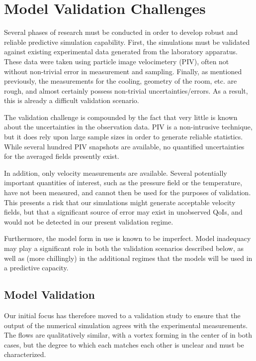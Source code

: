 \documentclass{article}
\begin{document}
%
%
\section{Model Validation Challenges}


Several phases of research must be conducted in order to develop robust
and reliable predictive simulation capability. First, the simulations
must be validated against existing experimental data generated from the
laboratory apparatus. These data were taken using particle image
velocimetery (PIV), often not without non-trivial error in measurement and
sampling. Finally, as mentioned previously, the measurements for the
cooling, geometry of the room, etc. are rough, and almost certainly
possess non-trivial uncertainties/errors. As a result, this is already a
difficult validation scenario. 

The validation challenge is compounded by the fact that very little is
known about the uncertainties in the observation data. PIV is a
non-intrusive technique, but it does rely upon large sample sizes in
order to generate reliable statistics. While several hundred PIV
snapshots are available, no quantified uncertainties for the averaged fields
presently exist.  

In addition, only velocity measurements are available. Several
potentially important quantities of interest, such as the pressure field
or the temperature, have not been measured, and cannot then be used for
the purposes of validation. This presents a risk that our 
simulations might generate acceptable velocity fields, but that a
significant source of error may exist in unobserved QoIs, and would not
be detected in our present validation regime. 

Furthermore, the model form in use is known to be imperfect. 
Model inadequacy may play a significant role in both the validation
scenarios described below, as well as (more chillingly) in the
additional regimes that the models will be used in a predictive
capacity. 

%
%
\subsection{Model Validation}
Our initial focus has therefore moved to a validation study to ensure that the
output of the numerical simulation agrees with the experimental
measurements. The flows are qualitatively similar, with a vortex forming
in the center of in both cases, but the degree to which each matches
each other is unclear and must be characterized. 
\end{document}
